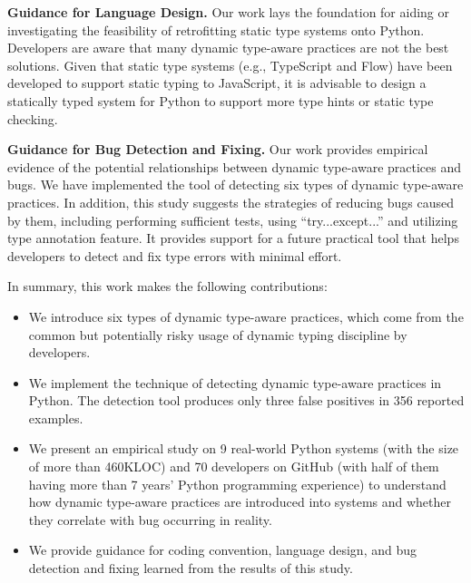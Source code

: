 \textbf{Guidance for Language Design.} Our work lays the foundation for aiding or investigating the feasibility of retrofitting static type systems onto Python. Developers are aware that many dynamic type-aware practices are not the best solutions. Given that static type systems (e.g., TypeScript\cite{b33} and Flow\cite{b34}) have been developed to support static typing to JavaScript, it is advisable to design a statically typed system for Python to support more type hints or static type checking.

\textbf{Guidance for Bug Detection and Fixing.} Our work provides empirical evidence of the potential relationships between dynamic type-aware practices and bugs. We have implemented the tool of detecting six types of dynamic type-aware practices. In addition, this study suggests the strategies of reducing bugs caused by them, including performing sufficient tests, using ``try...except...'' and utilizing type annotation feature. It provides support for a future practical tool that helps developers to detect and fix type errors with minimal effort.

In summary, this work makes the following contributions:
\begin{itemize}
\item 
We introduce six types of dynamic type-aware practices, which come from the common but potentially risky usage of dynamic typing discipline by developers.
\item 
We implement the technique of detecting dynamic type-aware practices in Python. The detection tool produces only three false positives in 356 reported examples.
\item 
We present an empirical study on 9 real-world Python systems (with the size of more than 460KLOC) and 70 developers on GitHub (with half of them having more than 7 years' Python programming experience) to understand how dynamic type-aware practices are introduced into systems and whether they correlate with bug occurring in reality.
\item 
We provide guidance for coding convention, language design, and bug detection and fixing learned from the results of this study.
\end{itemize}




